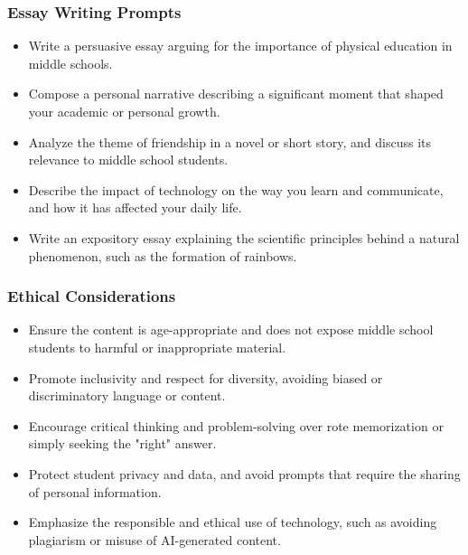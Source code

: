 \begin{frame}[fragile]\frametitle{Essay Writing Prompts}
    \begin{itemize}
        \item Write a persuasive essay arguing for the importance of physical education in middle schools.
        \item Compose a personal narrative describing a significant moment that shaped your academic or personal growth.
        \item Analyze the theme of friendship in a novel or short story, and discuss its relevance to middle school students.
        \item Describe the impact of technology on the way you learn and communicate, and how it has affected your daily life.
        \item Write an expository essay explaining the scientific principles behind a natural phenomenon, such as the formation of rainbows.
    \end{itemize}
\end{frame}


\begin{frame}[fragile]\frametitle{Ethical Considerations}
    \begin{itemize}
        \item Ensure the content is age-appropriate and does not expose middle school students to harmful or inappropriate material.
        \item Promote inclusivity and respect for diversity, avoiding biased or discriminatory language or content.
        \item Encourage critical thinking and problem-solving over rote memorization or simply seeking the "right" answer.
        \item Protect student privacy and data, and avoid prompts that require the sharing of personal information.
        \item Emphasize the responsible and ethical use of technology, such as avoiding plagiarism or misuse of AI-generated content.
    \end{itemize}
\end{frame}